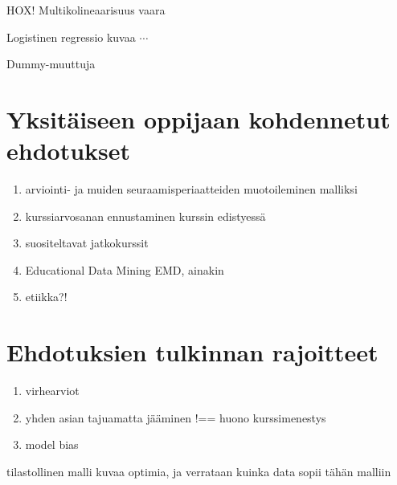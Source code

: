 HOX! Multikolineaarisuus vaara

Logistinen regressio kuvaa $\cdots$

Dummy-muuttuja







\section{Yksitäiseen oppijaan kohdennetut ehdotukset}

\begin{enumerate}
    \item arviointi- ja muiden seuraamisperiaatteiden muotoileminen malliksi
    \item kurssiarvosanan ennustaminen kurssin edistyessä
    \item suositeltavat jatkokurssit
    \item Educational Data Mining EMD, ainakin \cite{romeroEducationalDataMining2010}
    \item etiikka?! \cite{kailaEthicalConsiderationsLearning2019}
\end{enumerate}

\section{Ehdotuksien tulkinnan rajoitteet}  

\begin{enumerate}
    \item virhearviot
    \item yhden asian tajuamatta jääminen !== huono kurssimenestys
    \item model bias
\end{enumerate}


tilastollinen malli kuvaa optimia, ja verrataan kuinka data sopii tähän malliin